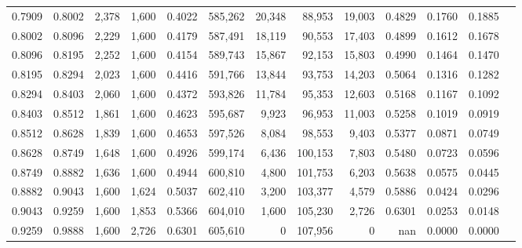 \begin{tabular}{rrrrrrrrrrrrr}
0.7909 & 0.8002 &  2,378 & 1,600 &                                     0.4022 & 585,262 &  20,348 &  88,953 &  19,003 & 0.4829 & 0.1760 & 0.1885 \\
0.8002 & 0.8096 &  2,229 & 1,600 &                                     0.4179 & 587,491 &  18,119 &  90,553 &  17,403 & 0.4899 & 0.1612 & 0.1678 \\
0.8096 & 0.8195 &  2,252 & 1,600 &                                     0.4154 & 589,743 &  15,867 &  92,153 &  15,803 & 0.4990 & 0.1464 & 0.1470 \\
0.8195 & 0.8294 &  2,023 & 1,600 &                                     0.4416 & 591,766 &  13,844 &  93,753 &  14,203 & 0.5064 & 0.1316 & 0.1282 \\
0.8294 & 0.8403 &  2,060 & 1,600 &                                     0.4372 & 593,826 &  11,784 &  95,353 &  12,603 & 0.5168 & 0.1167 & 0.1092 \\
0.8403 & 0.8512 &  1,861 & 1,600 &                                     0.4623 & 595,687 &   9,923 &  96,953 &  11,003 & 0.5258 & 0.1019 & 0.0919 \\
0.8512 & 0.8628 &  1,839 & 1,600 &                                     0.4653 & 597,526 &   8,084 &  98,553 &   9,403 & 0.5377 & 0.0871 & 0.0749 \\
0.8628 & 0.8749 &  1,648 & 1,600 &                                     0.4926 & 599,174 &   6,436 & 100,153 &   7,803 & 0.5480 & 0.0723 & 0.0596 \\
0.8749 & 0.8882 &  1,636 & 1,600 &                                     0.4944 & 600,810 &   4,800 & 101,753 &   6,203 & 0.5638 & 0.0575 & 0.0445 \\
0.8882 & 0.9043 &  1,600 & 1,624 &                                     0.5037 & 602,410 &   3,200 & 103,377 &   4,579 & 0.5886 & 0.0424 & 0.0296 \\
0.9043 & 0.9259 &  1,600 & 1,853 &                                     0.5366 & 604,010 &   1,600 & 105,230 &   2,726 & 0.6301 & 0.0253 & 0.0148 \\
0.9259 & 0.9888 &  1,600 & 2,726 &                                     0.6301 & 605,610 &       0 & 107,956 &       0 &    nan & 0.0000 & 0.0000 \\
\bottomrule
\end{tabular}
